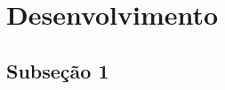 



\chapter[Desenvolvimento]{Desenvolvimento}\label{cha:desenvolvimento}
    \lipsum[1]



\section[Subseção 1]{Subseção 1}\label{sec:desenvolvimento-subsecao1}
    \lipsum[1]



